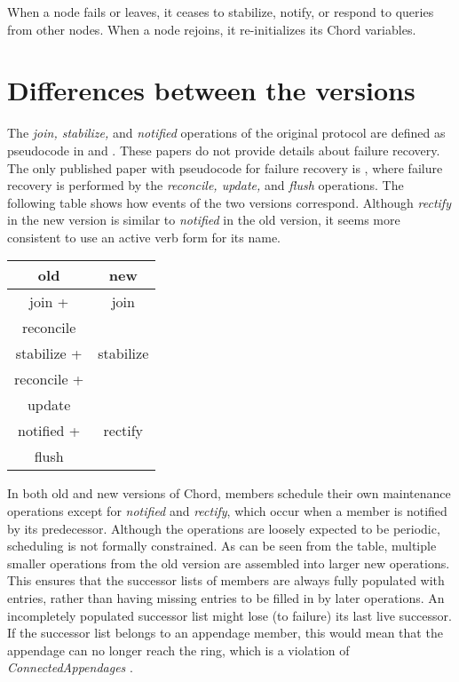 \documentclass[conference]{IEEEtran}
\begin{document}
When a node fails or leaves,
it ceases to stabilize, notify, or respond to queries
from other nodes.
When a node rejoins, it re-initializes its Chord variables.

\section{Differences between the versions}
\label{sec:diff}

The {\it join, stabilize,} and {\it notified}
operations of the original protocol are defined as pseudocode in
\cite{chord-sigcomm} and \cite{chord-ton}.
These papers do not provide details about failure recovery.
The only published paper with pseudocode for failure recovery is
\cite{chord-podc}, where failure recovery is
performed by the
{\it reconcile, update,} and {\it flush} operations.
The following table shows how events of the two versions correspond.
Although {\it rectify} in the new version is similar to
{\it notified} in the old version, it seems more consistent to use
an active verb form for its name.

\begin{center}
\footnotesize
\begin{tabular}{|c|c|}
\hline
{\bf old} & {\bf new} \\ \hline
join +	& join \\
reconcile &  \\ \hline
stabilize + & stabilize \\
reconcile + & \\
update & \\ \hline
notified + & rectify \\
flush & \\ \hline
\end{tabular}
\normalsize
\end{center}

In both old and new versions of Chord, members schedule their own
maintenance operations except for {\it notified} and
{\it rectify}, which occur when a member is notified by its 
predecessor.
Although the operations
are loosely expected to be periodic, scheduling is not formally
constrained.
As can be seen from the table, 
multiple smaller operations from the old version
are assembled into larger new operations.
This ensures that the successor lists of members are always fully
populated with  entries,
rather than having missing entries to be filled in by later
operations.
An incompletely populated successor list might lose (to failure)
its last live
successor.
If the successor list belongs to an appendage member, this would mean
that the appendage can no longer reach the ring, which is
a violation of {\it ConnectedAppendages} \cite{chord-ccr}.
\end{document}

